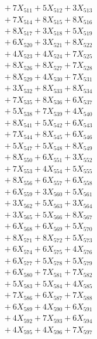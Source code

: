 \documentclass[a4paper,10pt]{article}
\begin{document}
{\begin{align}
&\;  + 7 X_{511} + 5 X_{512} + 3 X_{513} \\[0.3ex]
&\;  + 7 X_{514} + 8 X_{515} + 8 X_{516} \\[0.3ex]
&\;  + 8 X_{517} + 3 X_{518} + 5 X_{519} \\[0.5ex]\allowbreak
&\;  + 6 X_{520} + 3 X_{521} + 8 X_{522} \\[0.3ex]
&\;  + 4 X_{523} + 4 X_{524} + 7 X_{525} \\[0.3ex]
&\;  + 8 X_{526} + 8 X_{527} + 7 X_{528} \\[0.3ex]
&\;  + 8 X_{529} + 4 X_{530} + 7 X_{531} \\[0.3ex]
&\;  + 3 X_{532} + 8 X_{533} + 8 X_{534} \\[0.3ex]
&\;  + 7 X_{535} + 8 X_{536} + 6 X_{537} \\[0.3ex]
&\;  + 5 X_{538} + 7 X_{539} + 4 X_{540} \\[0.3ex]
&\;  + 8 X_{541} + 5 X_{542} + 6 X_{543} \\[0.3ex]
&\;  + 7 X_{544} + 8 X_{545} + 6 X_{546} \\[0.3ex]
&\;  + 5 X_{547} + 5 X_{548} + 8 X_{549} \\[0.5ex]\allowbreak
&\;  + 8 X_{550} + 6 X_{551} + 3 X_{552} \\[0.3ex]
&\;  + 7 X_{553} + 4 X_{554} + 5 X_{555} \\[0.3ex]
&\;  + 8 X_{556} + 6 X_{557} + 6 X_{558} \\[0.3ex]
&\;  + 6 X_{559} + 3 X_{560} + 5 X_{561} \\[0.3ex]
&\;  + 3 X_{562} + 5 X_{563} + 3 X_{564} \\[0.3ex]
&\;  + 3 X_{565} + 5 X_{566} + 8 X_{567} \\[0.3ex]
&\;  + 6 X_{568} + 6 X_{569} + 5 X_{570} \\[0.3ex]
&\;  + 8 X_{571} + 8 X_{572} + 5 X_{573} \\[0.3ex]
&\;  + 6 X_{574} + 6 X_{575} + 4 X_{576} \\[0.3ex]
&\;  + 6 X_{577} + 5 X_{578} + 5 X_{579} \\[0.5ex]\allowbreak
&\;  + 6 X_{580} + 7 X_{581} + 7 X_{582} \\[0.3ex]
&\;  + 5 X_{583} + 5 X_{584} + 4 X_{585} \\[0.3ex]
&\;  + 7 X_{586} + 6 X_{587} + 7 X_{588} \\[0.3ex]
&\;  + 6 X_{589} + 4 X_{590} + 6 X_{591} \\[0.3ex]
&\;  + 4 X_{592} + 7 X_{593} + 6 X_{594} \\[0.3ex]
&\;  + 4 X_{595} + 4 X_{596} + 7 X_{597} \\[0.3ex]

\end{align}}
\end{document}
